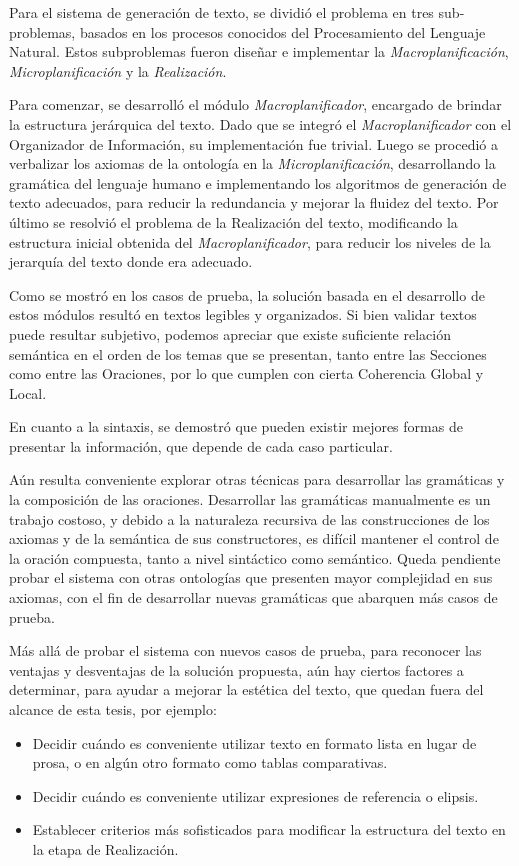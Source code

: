 Para el sistema de generación de texto, se dividió el problema en tres sub-problemas, basados en los procesos conocidos del Procesamiento del Lenguaje Natural. Estos subproblemas fueron diseñar e implementar la \textit{Macroplanificación},\textit{ Microplanificación} y  la \textit{Realización}. 

Para comenzar, se desarrolló el módulo \textit{Macroplanificador}, encargado de brindar la estructura jerárquica del texto. Dado que se integró el \textit{Macroplanificador} con el Organizador de Información, su implementación fue trivial.
Luego se procedió a verbalizar los axiomas de la ontología en la \textit{Microplanificación}, desarrollando la gramática del lenguaje humano e implementando los algoritmos de generación de texto adecuados, para reducir la redundancia y mejorar la fluidez del texto.
Por  último  se  resolvió  el  problema  de  la  Realización  del  texto,  modificando  la  estructura inicial obtenida del \textit{Macroplanificador}, para reducir los niveles de la jerarquía del texto donde era adecuado.

Como se mostró en los casos de prueba, la solución basada en el desarrollo de estos módulos resultó en textos legibles y organizados. Si bien validar textos puede resultar subjetivo, podemos apreciar que existe suficiente relación semántica en el orden de los temas que se presentan, tanto entre las Secciones como entre las Oraciones, por lo que cumplen con cierta Coherencia Global y Local.

En cuanto a la sintaxis, se demostró que pueden existir mejores formas de presentar la información, que depende de cada caso particular.

Aún resulta conveniente explorar otras técnicas para desarrollar las gramáticas y la composición de las oraciones. Desarrollar las gramáticas manualmente es un trabajo costoso, y debido a la naturaleza recursiva de las construcciones de los axiomas y de la semántica de sus constructores, es difícil mantener el control de la oración compuesta, tanto a nivel sintáctico como semántico. Queda pendiente probar el sistema con otras ontologías que presenten mayor complejidad en sus axiomas, con el fin de desarrollar nuevas gramáticas que abarquen más casos de prueba.

Más allá de probar el sistema con nuevos casos de prueba, para reconocer las ventajas y desventajas de la solución propuesta, aún hay ciertos factores a determinar, para ayudar a mejorar la estética del texto, que quedan fuera del alcance de esta tesis, por ejemplo:
\begin{itemize}
    \item Decidir cuándo es conveniente utilizar texto en formato lista en lugar de prosa, o en algún otro formato como tablas comparativas.
    \item Decidir cuándo es conveniente utilizar expresiones de referencia o elipsis.
    \item Establecer criterios más sofisticados para modificar la estructura del texto en la etapa de Realización. 
\end{itemize}
